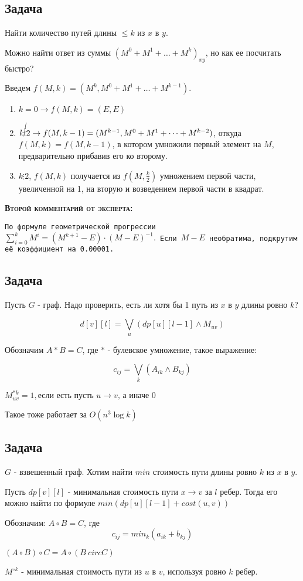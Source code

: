 \subsection{Задача} Найти количество путей длины \(\leq k\) из $x$ в $y$.

Можно найти ответ из суммы $(M^0 + M^1 + \dots + M^k)_{xy}$, но как ее посчитать быстро?

Введем $f(M, k) = (M^k, M^0 + M^1 + \dots + M^{k - 1}).$
\begin{enumerate}
  \item $k = 0 \to f(M, k) = (E, E)$
  \item  $k \cancel{\vdots} 2 \to f(M, k - 1) = (M^{k - 1}, M^0 + M^1 + \dots + M^{k - 2})$, откуда $f(M, k) = f(M, k - 1)$, в котором умножили первый элемент на $M$, предварительно прибавив его ко второму.
  \item  $k \vdots 2$, $f(M, k)$ получается из $f(M, \frac{k}{2})$ умножением первой части, увеличенной на 1, на вторую и возведением первой части в квадрат.
\end{enumerate}

\textsc{\textbf{Второй комментарий от эксперта:}}

\texttt{По формуле геометрической прогрессии $\sum_{i = 0} ^ {k} M^{i} = (M^{k + 1} - E) \cdot {(M - E) ^ {-1}}.$ Если $M - E$ необратима, подкрутим её коэффициент на 0.00001.}

\subsection{Задача} 
Пусть $G$ - граф. Надо проверить, есть ли хотя бы 1 путь из \(x\) в \(y\) длины ровно $k$?

$$d[v][l] = \bigvee_{u}(dp[u][l - 1] \wedge M_{uv})$$

Обозначим $A * B = C$, где $*$ - булевское умножение, такое выражение:

$$c_{ij} = \bigvee_{k}(A_{ik} \wedge B_{kj})$$
\begin{proposition}
  $M^{*k}_{uv} = 1, \text{если есть пусть $u \to v$, а иначе 0}$

  Такое тоже работает за $O(n^3 \log{k})$
\end{proposition}
\subsection{Задача} $G$ - взвешенный граф. Хотим найти $min$ стоимость пути длины ровно $k$ из $x$ в $y$.

Пусть $dp[v][l]$ - минимальная стоимость пути $x \to v$ за $l$ ребер.
Тогда его можно найти по формуле $min(dp[u][l-1] + cost(u, v))$

Обозначим: $A \circ B = C$, где $$c_{ij} = min_{k}(a_{ik} + b_{kj})$$

$(A \circ B) \circ C = A \circ (B \ circ C)$

\begin{proposition}
  
  $M^{\circ k}$ - минимальная стоимость пути из $u$ в $v$, используя ровно $k$ ребер.
\end{proposition}

